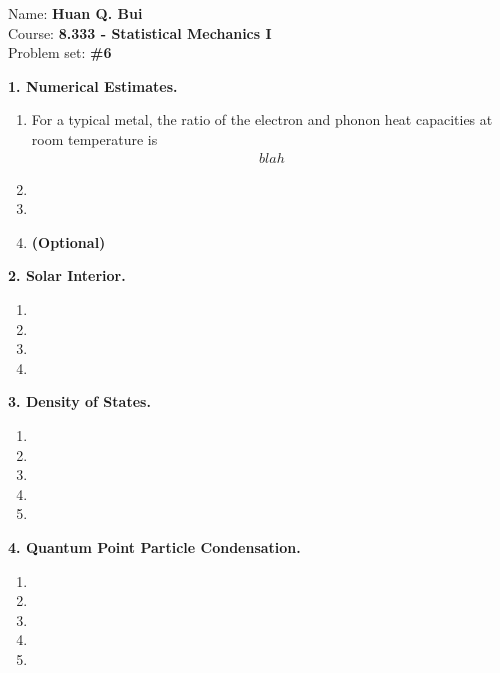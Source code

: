 \documentclass{article}
\theoremstyle{definition}
\begin{document}
		\begin{framed}
			\noindent Name: \textbf{Huan Q. Bui}\\
			Course: \textbf{8.333 - Statistical Mechanics I}\\
			Problem set: \textbf{\#6}
		\end{framed}
	
	
\noindent \textbf{1. Numerical Estimates.}

\begin{enumerate}[label=(\alph*)]
	\item For a typical metal, the ratio of the electron and phonon heat capacities at room temperature is 
	\begin{align*}
	blah
	\end{align*}
	
	\item 
	
	\item 
	
	\item \textbf{(Optional)}
\end{enumerate}


\noindent \textbf{2. Solar Interior.}

\begin{enumerate}[label=(\alph*)]
	\item 
	
	\item 
	
	\item 
	
	\item 
\end{enumerate}



\noindent \textbf{3. Density of States.}

\begin{enumerate}[label=(\alph*)]
	\item 
	
	\item 
	
	\item 
	
	\item 
	
	\item 
\end{enumerate}




\noindent \textbf{4. Quantum Point Particle Condensation.}

\begin{enumerate}[label=(\alph*)]
	\item 
	
	\item 
	
	\item 
	
	\item 
	
	\item 
\end{enumerate}
\end{document}
